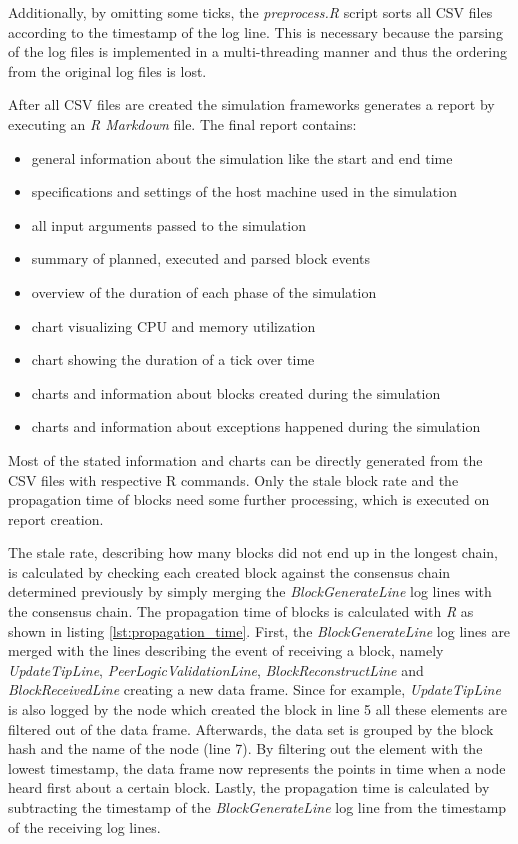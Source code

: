 Additionally, by omitting some ticks, the \textit{preprocess.R} script sorts all CSV files according to the timestamp of the log line.
This is necessary because the parsing of the log files is implemented in a multi-threading manner and thus the ordering from the original log files is lost.

After all CSV files are created the simulation frameworks generates a report by executing an \textit{R Markdown} file.
The final report contains:
\begin{itemize}
	\item general information about the simulation like the start and end time
	\item specifications and settings of the host machine used in the simulation
	\item all input arguments passed to the simulation
	\item summary of planned, executed and parsed block events
	\item overview of the duration of each phase of the simulation
	\item chart visualizing CPU and memory utilization
	\item chart showing the duration of a tick over time
	\item charts and information about blocks created during the simulation
	\item charts and information about exceptions happened during the simulation
\end{itemize}

Most of the stated information and charts can be directly generated from the CSV files with respective R commands.
Only the stale block rate and the propagation time of blocks need some further processing, which is executed on report creation.

The stale rate, describing how many blocks did not end up in the longest chain, is calculated by checking each created block against the consensus chain determined previously by simply merging the \textit{BlockGenerateLine} log lines with the consensus chain.
The propagation time of blocks is calculated with \textit{R} as shown in listing \ref{lst:propagation_time}.
First, the \textit{BlockGenerateLine} log lines are merged with the lines describing the event of receiving a block, namely	\textit{UpdateTipLine}, \textit{PeerLogicValidationLine}, \textit{BlockReconstructLine} and \textit{BlockReceivedLine} creating a new data frame.
Since for example, \textit{UpdateTipLine} is also logged by the node which created the block in line 5 all these elements are filtered out of the data frame.
Afterwards, the data set is grouped by the block hash and the name of the node (line 7).
By filtering out the element with the lowest timestamp, the data frame now represents the points in time when a node heard first about a certain block.
Lastly, the propagation time is calculated by subtracting the timestamp of the \textit{BlockGenerateLine} log line from the timestamp of the receiving log lines.

